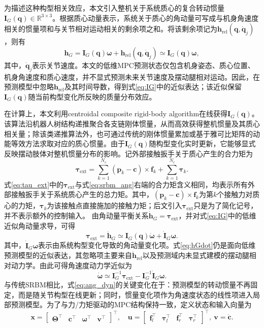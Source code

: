 ﻿\documentclass[preprint,12pt]{elsarticle}
\begin{document}
为描述这种构型相关效应，本文引入整机关于系统质心的复合转动惯量$\bm I_G(\bm q)\in\mathbb{R}^{3\times3}$。根据质心动量表示，系统关于质心的角动量可写成与机身角速度相关的惯量项和与关节相对运动相关的剩余项之和。将该剩余项记为$\bm h_{\mathrm{rel}}(\bm q,\dot{\bm q}_j)$，则有
\begin{equation}
\bm h_G
=\bm I_G(\bm q)\bm\omega+\bm h_{\mathrm{rel}}(\bm q,\dot{\bm q}_j)
\simeq \bm I_G(\bm q)\bm\omega ,
\label{eq:IG}
\end{equation}
其中，$\dot{\bm q}_j$表示关节速度。本文的低维MPC预测状态仅包含机身姿态、质心位置、机身角速度和质心速度，并不显式预测未来关节速度及摆动腿相对运动。因此，在预测模型中忽略$\bm h_{\mathrm{rel}}$及其时间导数，得到式\eqref{eq:IG}中的近似表达；该近似保留$\bm I_G(\bm q)$随当前构型变化所反映的质量分布效应。

在计算上，本文利用centroidal composite rigid-body algorithm在线获得$\bm I_G(\bm q)$。该算法沿机器人树结构递推聚合各支链刚体惯量，从而高效获得整机惯量及其质心相关量\cite{ref44,ref80}；除该类递推算法外，也可通过传统的刚体惯量累加或基于雅可比矩阵的动能等效方法求取对应的质心惯量。由于$\bm I_G(\bm q)$随构型变化实时更新，它能够显式反映摆动肢体对整机惯量分布的影响。记外部接触扳手关于质心产生的合力矩为
\begin{equation}
\bm\tau_{\text{ext}}
=\sum_{k=1}^{N_c}(\bm p_k-\bm c)\times \bm f_k+\sum_{k=1}^{N_c}\bm\tau_k .
\label{eq:tau_ext}
\end{equation}
式\eqref{eq:tau_ext}中的$\bm\tau_{\text{ext}}$与式\eqref{eq:srbm_ang}右端的合力矩含义相同，均表示所有外部接触扳手关于系统质心产生的总力矩。其中，$(\bm p_k-\bm c)\times \bm f_k$为第$k$个接触力对质心的力矩，$\bm\tau_k$为该接触点直接施加的接触力矩；后文引入$\bm\tau_{\text{ext}}$只是为了简化记号，并不表示额外的控制输入。
由角动量平衡关系$\dot{\bm h}_G=\bm\tau_{\text{ext}}$，并对式\eqref{eq:IG}中的低维近似角动量求导，可得
\begin{equation}
\bm\tau_{\text{ext}}
=\dot{\bm h}_G
\simeq
\bm I_G(\bm q)\dot{\bm\omega}
+\dot{\bm I}_G\bm\omega .
\label{eq:hGdot}
\end{equation}
其中，$\dot{\bm I}_G\bm\omega$表示由系统构型变化导致的角动量变化项。式\eqref{eq:hGdot}仍是面向低维预测模型的近似表达，其忽略项主要来自$\dot{\bm h}_{\mathrm{rel}}$以及预测域内未显式建模的摆动腿相对动力学。由此可得角速度动力学近似为
\begin{equation}
\dot{\bm\omega}
\simeq
\bm I_G^{-1}\bm\tau_{\text{ext}}
-\bm I_G^{-1}\dot{\bm I}_G\bm\omega .
\label{eq:ang_dyn}
\end{equation}
与传统SRBM相比，式\eqref{eq:ang_dyn}的关键变化在于：预测模型的转动惯量不再固定，而是随关节构型在线更新；同时，惯量变化项作为角速度状态的线性项进入局部预测模型。为了与力/力矩驱动的MPC结构保持一致，定义状态和输入向量为\begin{equation}
\bm x=\begin{bmatrix}\bm\Theta^\top&\bm c^\top&\bm\omega^\top&\bm v^\top\end{bmatrix}^\top,\quad
\bm u=\begin{bmatrix}\bm f_l^\top&\bm\tau_l^\top&\bm f_r^\top&\bm\tau_r^\top\end{bmatrix}^\top,\ \bm v=\dot{\bm c}.
\label{eq:state_input}
\end{equation}
\end{document}
